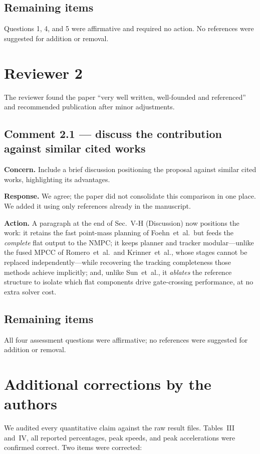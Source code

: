 \documentclass[11pt]{article}
\newcommand{\concern}[1]{\par\smallskip\textbf{Concern.} #1}
\newcommand{\response}[1]{\par\textbf{Response.} #1}
\newcommand{\action}[1]{\par\textbf{Action.} #1\par\smallskip}
\newcommand{\nmpc}{NMPC}
\begin{document}
\subsection*{Remaining items}
Questions 1, 4, and 5 were affirmative and required no action. No references
were suggested for addition or removal.

\section*{Reviewer 2}
The reviewer found the paper ``very well written, well-founded and
referenced'' and recommended publication after minor adjustments.

\subsection*{Comment 2.1 --- discuss the contribution against similar cited works}
\concern{Include a brief discussion positioning the proposal against
similar cited works, highlighting its advantages.}
\response{We agree; the paper did not consolidate this comparison in one
place. We added it using only references already in the manuscript.}
\action{A paragraph at the end of Sec.~V-H (Discussion) now positions the
work: it retains the fast point-mass planning of Foehn~et~al.\ but feeds the
\emph{complete} flat output to the \nmpc{}; it keeps planner and tracker
modular---unlike the fused MPCC of Romero~et~al.\ and Krinner~et~al.,
whose stages cannot be replaced independently---while recovering the
tracking completeness those methods achieve implicitly; and, unlike
Sun~et~al., it \emph{ablates} the reference structure to isolate which flat
components drive gate-crossing performance, at no extra solver cost.}

\subsection*{Remaining items}
All four assessment questions were affirmative; no references were suggested
for addition or removal.

\section*{Additional corrections by the authors}
We audited every quantitative claim against the raw result files. Tables~III
and~IV, all reported percentages, peak speeds, and peak accelerations were
confirmed correct. Two items were corrected:
\end{document}
